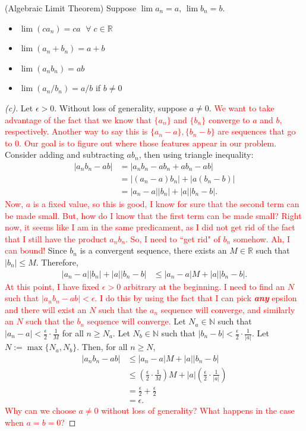 \documentclass{ximera}
\begin{document}
\begin{theorem}{(Algebraic Limit Theorem)}
Suppose $\lim a_n = a$, $\lim b_n = b$.
    \begin{itemize}
        \item $\lim(ca_n) = ca$ $\; \forall \;c \in \mathbb{R}$
        \item $\lim (a_n + b_n) = a+b$
        \item $\lim(a_nb_n) = ab$
        \item $\lim(a_n/b_n) = a/b$ if $b \neq 0$
    \end{itemize}
\end{theorem}
\begin{proof}[(c)]
    Let $\epsilon > 0$.  Without loss of generality, suppose $a \neq 0$.  \textcolor{red}{We want to take advantage of the fact that we know that $\{a_n\}$ and $\{b_n\}$ converge to $a$ and $b$, respectively.  Another way to say this is $\{a_n -a\}, \{b_n-b\}$ are sequences that go to $0$.  Our goal is to figure out where those features appear in our problem.} Consider adding and subtracting $ab_n$, then using triangle inequality:
    \begin{align}
        |a_nb_n -ab| &= |a_nb_n - ab_n + ab_n - ab|
        \\
        &=
        |(a_n-a)b_n| + |a(b_n-b)|
        \\
        &= |a_n-a||b_n| + |a||b_n-b|.
    \end{align}
\textcolor{red}{Now, $a$ is a fixed value, so this is good, I know for sure that the second term can be made small.  But, how do I know that the first term can be made small?  Right now, it seems like I am in the same predicament, as I did not get rid of the fact that I still have the product $a_nb_n$.  So, I need to ``get rid" of $b_n$ somehow.  Ah, I can bound!}  Since $b_n$ is a convergent sequence, there exists an $M \in \mathbb{R}$ such that $|b_n| \leq M$.  Therefore,  
\begin{align}
    |a_n-a||b_n| + |a||b_n-b|
    &\leq |a_n-a|M + |a||b_n-b|.
\end{align}
\textcolor{red}{At this point, I have fixed $\epsilon > 0$ arbitrary at the beginning.  I need to find an $N$ such that $|a_nb_n-ab| < \epsilon$.  I do this by using the fact that I can pick \textit{\textbf{any}} epsilon and there will exist an $N$ such that the $a_n$ sequence will converge, and similarly an $N$ such that the $b_n$ sequence will converge.} Let $N_a \in \mathbb{N}$ such that $|a_n-a| < \frac{\epsilon}2\cdot \frac{1}M$ for all $n \geq N_a$.  Let $N_b \in \mathbb{N}$ such that $|b_n-b| < \frac{\epsilon}2\cdot \frac{1}{|a|}$.  Let $N := \max\{N_a,N_b\}$.  Then, for all $n \geq N$,
\begin{align}
    |a_nb_n -ab| &\leq |a_n-a|M + |a||b_n-b|
    \\
    &\leq \left( \frac{\epsilon}2\cdot \frac{1}M \right)M  + |a| \left(\frac{\epsilon}2\cdot \frac{1}{|a|} \right)
    \\
    &= \frac{\epsilon}2+ \frac{\epsilon}2
    \\
    &= \epsilon.
\end{align}
\textcolor{red}{Why can we choose $a\neq 0$ without loss of generality?  What happens in the case when $a= b= 0$?}
\end{proof}
\end{document}
